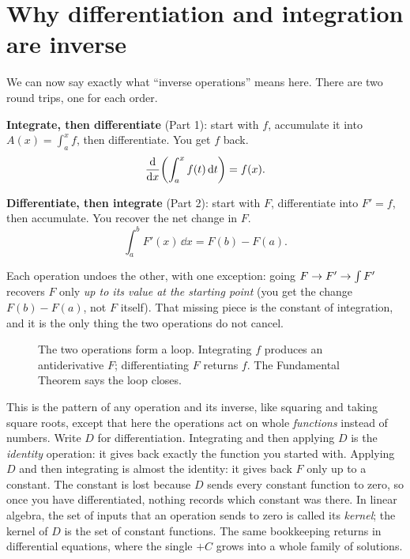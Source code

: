 \section{Why differentiation and integration are inverse}

We can now say exactly what ``inverse operations'' means here. There are two
round trips, one for each order.

\begin{focusbox}
\textbf{Integrate, then differentiate} (Part 1): start with $f$, accumulate it
into $A(x)=\int_a^x f$, then differentiate. You get $f$ back.
\[
  \frac{\mathrm{d}}{\mathrm{d} x}\!\left(\int_a^x f(t)\,\mathrm{d} t\right) = f(x).
\]

\textbf{Differentiate, then integrate} (Part 2): start with $F$, differentiate
into $F'=f$, then accumulate. You recover the net change in $F$.
\[
  \int_a^b F'(x)\,\dd x = F(b)-F(a).
\]

Each operation undoes the other, with one exception: going
$F\to F'\to \int F'$ recovers $F$ only \emph{up to its value at the starting
point} (you get the change $F(b)-F(a)$, not $F$ itself). That missing piece
is the constant of integration, and it is the only thing the two operations
do not cancel.
\end{focusbox}

\begin{figure}[H]
\centering
{}
\caption{The two operations form a loop. Integrating $f$ produces an
antiderivative $F$; differentiating $F$ returns $f$. The Fundamental Theorem says
the loop closes.}
\label{ch21:fig-loop}
\end{figure}

\begin{connectionbox}
This is the pattern of any operation and its inverse, like squaring and taking
square roots, except that here the operations act on whole \emph{functions}
instead of numbers. Write $D$ for differentiation. Integrating and then applying
$D$ is the \emph{identity} operation: it gives back exactly the function you
started with. Applying $D$ and then integrating is almost the identity: it gives
back $F$ only up to a constant. The constant is lost because $D$ sends every
constant function to zero, so once you have differentiated, nothing records which
constant was there. In linear algebra, the set of inputs that an operation sends
to zero is called its \emph{kernel}; the kernel of $D$ is the set of constant
functions. The same bookkeeping returns in differential equations, where the
single $+C$ grows into a whole family of solutions.
\end{connectionbox}

